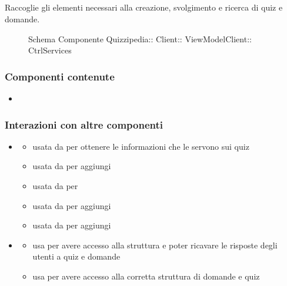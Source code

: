 \subsection{}
Raccoglie gli elementi necessari alla creazione, svolgimento e ricerca di quiz e domande.
\begin{figure}[H]
\centering
\noindent{}
\caption[Schema Componente CtrlServices]{Schema Componente Quizzipedia:: Client:: ViewModelClient:: CtrlServices}
\end{figure}
\subsubsection{Componenti contenute}
\begin{itemize}
\item {}
\end{itemize}
\subsubsection{Interazioni con altre componenti}
\begin{itemize}
\item {}
\begin{itemize}
\item usata da  per ottenere le informazioni che le servono sui quiz
\item usata da  per aggiungi
\item usata da  per 
\item usata da  per aggiungi
\item usata da  per aggiungi
\end{itemize}
\item {}
\begin{itemize}
\item usa  per avere accesso alla struttura e poter ricavare le risposte degli utenti a quiz e domande
\item usa  per avere accesso alla corretta struttura di domande e quiz
\end{itemize}
\end{itemize}
